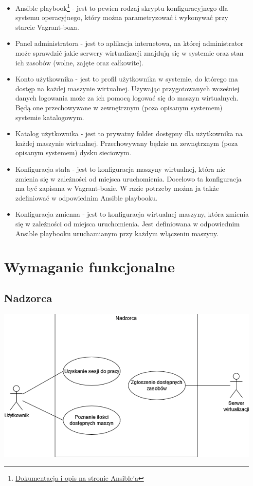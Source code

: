\documentclass[12pt]{article}
\begin{document}
\begin{itemize}
	\item Ansible playbook\footnote{\href{https://www.redhat.com/en/topics/automation/what-is-an-ansible-playbook\#example-of-ansible-playbook}{Dokumentacja i opis na stronie Ansible'a}} - jest to pewien rodzaj skryptu konfiguracyjnego dla systemu operacyjnego, który można parametryzować i wykonywać przy starcie Vagrant-boxa.
	\item Panel administratora - jest to aplikacja internetowa, na której administrator może sprawdzić jakie serwery wirtualizacji znajdują się w systemie oraz stan ich zasobów (wolne, zajęte oraz całkowite).
	\item Konto użytkownika - jest to profil użytkownika w systemie, do którego ma dostęp na każdej maszynie wirtualnej. Używając przygotowanych wcześniej danych logowania może za ich pomocą logować się do maszyn wirtualnych. Będą one przechowywane w zewnętrznym (poza opisanym systemem) systemie katalogowym.
	\item Katalog użytkownika - jest to prywatny folder dostępny dla użytkownika na każdej maszynie wirtualnej. Przechowywany będzie na zewnętrznym (poza opisanym systemem) dysku sieciowym.
	\item Konfiguracja stała - jest to konfiguracja maszyny wirtualnej, która nie zmienia się w zależności od miejsca uruchomienia. Docelowo ta konfiguracja ma być zapisana w Vagrant-boxie. W razie potrzeby można ja także zdefiniować w odpowiednim Ansible playbooku.
	\item Konfiguracja zmienna - jest to konfiguracja wirtualnej maszyny, która zmienia się w zależności od miejsca uruchomienia. Jest definiowana w odpowiednim Ansible playbooku uruchamianym przy każdym włączeniu maszyny.
\end{itemize}

\section{Wymaganie funkcjonalne}
\subsection{Nadzorca}
\includegraphics[width=\textwidth]{../diagrams/use_cases/overseer.png}
\end{document}
